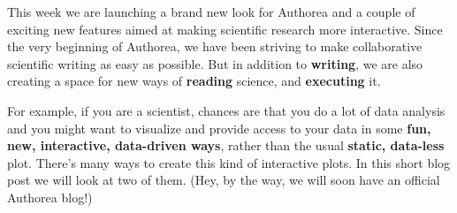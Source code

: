 This week we are launching a brand new look for Authorea and a couple of exciting new features aimed at making scientific research more interactive. Since the very beginning of Authorea, we have been striving to make collaborative scientific writing as easy as possible. But in addition to \textbf{writing}, we are also creating a space for new ways of \textbf{reading} science, and \textbf{executing} it.

For example, if you are a scientist, chances are that you do a lot of data analysis and you might want to visualize and provide access to your data in some \textbf{fun, new, interactive, data-driven ways}, rather than the usual \textbf{static, data-less} plot. There's many ways to create this kind of interactive plots. In this short blog post we will look at two of them. (Hey, by the way, we will soon have an official Authorea blog!)
